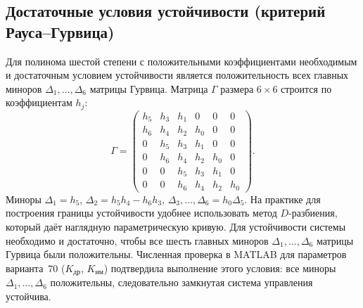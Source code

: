 \documentclass[a4paper, 14pt]{extarticle}
\begin{document}
\subsection{Достаточные условия устойчивости (критерий Рауса–Гурвица)}
Для полинома шестой степени с положительными коэффициентами необходимым и достаточным условием устойчивости является положительность всех главных миноров \(\Delta_1,\dots,\Delta_6\) матрицы Гурвица. Матрица \(\Gamma\) размера \(6\times6\) строится по коэффициентам \(h_j\):
\[
    \Gamma = \begin{pmatrix}
        h_5 & h_3 & h_1 & 0   & 0   & 0   \\
        h_6 & h_4 & h_2 & h_0 & 0   & 0   \\
        0   & h_5 & h_3 & h_1 & 0   & 0   \\
        0   & h_6 & h_4 & h_2 & h_0 & 0   \\
        0   & 0   & h_5 & h_3 & h_1 & 0   \\
        0   & 0   & h_6 & h_4 & h_2 & h_0
    \end{pmatrix}.
\]
Миноры \(\Delta_1=h_5\), \(\Delta_2=h_5h_4-h_6h_3\), \(\Delta_3,\dots,\Delta_6=h_0\Delta_5\). На практике для построения границы устойчивости удобнее использовать метод \(D\)-разбиения, который даёт наглядную параметрическую кривую.
Для устойчивости системы необходимо и достаточно, чтобы все
шесть главных миноров \(\Delta_1,\dots,\Delta_6\) матрицы
Гурвица были положительны. Численная проверка в MATLAB для
параметров варианта~70 (\(K_{\text{др}}\), \(K_{\text{им}}\))
подтвердила выполнение этого условия: все миноры
\(\Delta_1,\dots,\Delta_6\) положительны, следовательно
замкнутая система управления устойчива.
\end{document}
